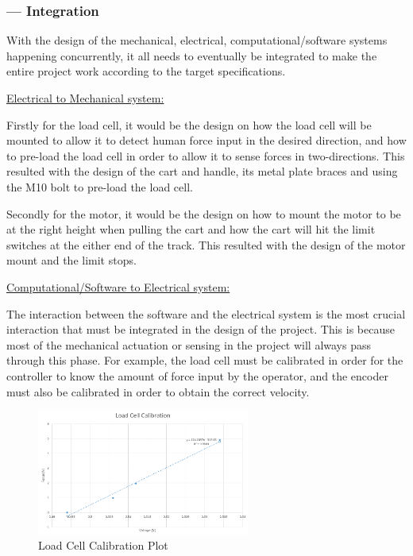 \subsubsection*{ --- Integration}\par
With the design of the mechanical, electrical, computational/software systems happening concurrently, it all needs to eventually be integrated to make the entire project work according to the target specifications.\par
\vspace{.167in}
\noindent\underline{Electrical to Mechanical system:}\par
\vspace{.08in}
Firstly for the load cell, it would be the design on how the load cell will be mounted to allow it to detect human force input in the desired direction, and how to pre-load the load cell in order to allow it to sense forces in two-directions. This resulted with the design of the cart and handle, its metal plate braces and using the M10 bolt to pre-load the load cell.\par
Secondly for the motor, it would be the design on how to mount the motor to be at the right height when pulling the cart and how the cart will hit the limit switches at the either end of the track. This resulted with the design of the motor mount and the limit stops.\par
\vspace{.167in}
\noindent\underline{Computational/Software to Electrical system:} \par
\vspace{.08in}
The interaction between the software and the electrical system is the most crucial interaction that must be integrated in the design of the project. This is because most of the mechanical actuation or sensing in the project will always pass through this phase. For example, the load cell must be calibrated in order for the controller to know the amount of force input by the operator, and the encoder must also be calibrated in order to obtain the correct velocity. \par
\begin{figure}[ht]
\begin{center}
\includegraphics[width=2.75in]{Images/load_cell_cali.PNG}
\caption{Load Cell Calibration Plot}
\label{LC_cali}
\end{center}
\end{figure}
